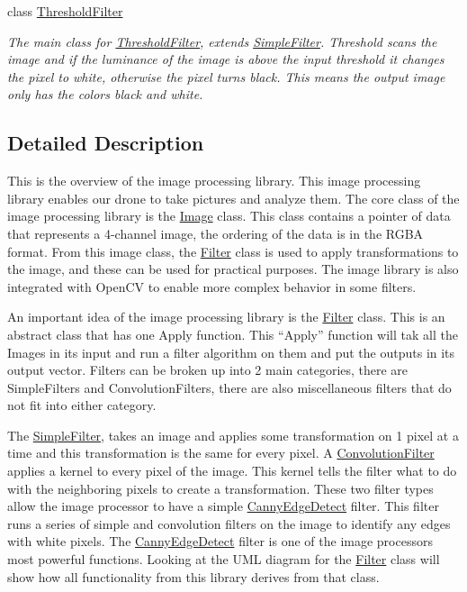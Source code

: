 \begin{DoxyCompactItemize}
class \hyperlink{classThresholdFilter}{Threshold\+Filter}
\begin{DoxyCompactList}\small\item\em The main class for \hyperlink{classThresholdFilter}{Threshold\+Filter}, extends \hyperlink{classSimpleFilter}{Simple\+Filter}. Threshold scans the image and if the luminance of the image is above the input threshold it changes the pixel to white, otherwise the pixel turns black. This means the output image only has the colors black and white. \end{DoxyCompactList}\end{DoxyCompactItemize}


\subsection{Detailed Description}
This is the overview of the image processing library. This image processing library enables our drone to take pictures and analyze them. The core class of the image processing library is the \hyperlink{classImage}{Image} class. This class contains a pointer of data that represents a 4-\/channel image, the ordering of the data is in the R\+G\+BA format. From this image class, the \hyperlink{classFilter}{Filter} class is used to apply transformations to the image, and these can be used for practical purposes. The image library is also integrated with Open\+CV to enable more complex behavior in some filters.

An important idea of the image processing library is the \hyperlink{classFilter}{Filter} class. This is an abstract class that has one Apply function. This “\+Apply” function will tak all the Images in its input and run a filter algorithm on them and put the outputs in its output vector. Filters can be broken up into 2 main categories, there are Simple\+Filters and Convolution\+Filters, there are also miscellaneous filters that do not fit into either category.

The \hyperlink{classSimpleFilter}{Simple\+Filter}, takes an image and applies some transformation on 1 pixel at a time and this transformation is the same for every pixel. A \hyperlink{classConvolutionFilter}{Convolution\+Filter} applies a kernel to every pixel of the image. This kernel tells the filter what to do with the neighboring pixels to create a transformation. These two filter types allow the image processor to have a simple \hyperlink{classCannyEdgeDetect}{Canny\+Edge\+Detect} filter. This filter runs a series of simple and convolution filters on the image to identify any edges with white pixels. The \hyperlink{classCannyEdgeDetect}{Canny\+Edge\+Detect} filter is one of the image processors most powerful functions. Looking at the U\+ML diagram for the \hyperlink{classFilter}{Filter} class will show how all functionality from this library derives from that class.

